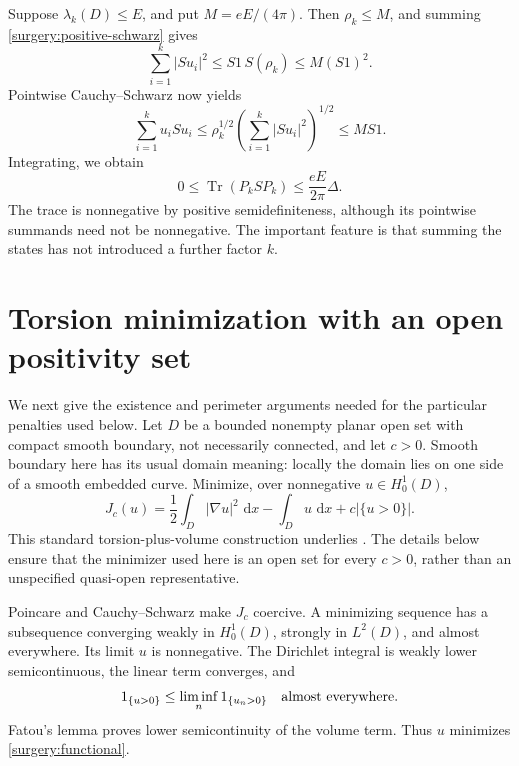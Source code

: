 \documentclass[11pt,reqno]{amsart}
\numberwithin{equation}{section}
\newcommand{\dd}{\,\mathrm d}
\newcommand{\abs}[1]{\lvert#1\rvert}
\begin{document}
Suppose \(\lambda_k(D)\le E\), and put \(M=eE/(4\pi)\).  Then
\(\rho_k\le M\), and summing \eqref{surgery:positive-schwarz} gives
\[
 \sum_{i=1}^k\abs{Su_i}^2
 \le S1\,S(\rho_k)\le M(S1)^2.
\]
Pointwise Cauchy--Schwarz now yields
\[
 \sum_{i=1}^k u_iSu_i
 \le \rho_k^{1/2}
       \left(\sum_{i=1}^k\abs{Su_i}^2\right)^{1/2}
 \le M S1.
\]
Integrating, we obtain
\begin{equation}
 0\le\operatorname{Tr}(P_kSP_k)
 \le \frac{eE}{2\pi}\Delta.
 \label{surgery:trace}
\end{equation}
The trace is nonnegative by positive semidefiniteness, although its
pointwise summands need not be nonnegative.  The important feature is
that summing the states has not introduced a further factor \(k\).

\section{Torsion minimization with an open positivity set}
\label{surgery:minimization}

We next give the existence and perimeter arguments needed for the
particular penalties used below.  Let \(D\) be a bounded nonempty
planar open set with compact smooth boundary, not necessarily
connected, and let \(c>0\).  Smooth boundary here has its usual domain
meaning: locally the domain lies on one side of a smooth embedded
curve.  Minimize, over nonnegative \(u\in H^1_0(D)\),
\begin{equation}
 J_c(u)=\frac12\int_D\abs{\nabla u}^2\,\dd x
            -\int_Du\,\dd x+c\abs{\{u>0\}}.
 \label{surgery:functional}
\end{equation}
This standard torsion-plus-volume construction underlies
\cite{Bucur2012,BucurMazzoleni2015}.  The details below ensure that the
minimizer used here is an open set for every \(c>0\), rather than an
unspecified quasi-open representative.

Poincare and Cauchy--Schwarz make \(J_c\) coercive.  A minimizing
sequence has a subsequence converging weakly in \(H^1_0(D)\), strongly
in \(L^2(D)\), and almost everywhere.  Its limit \(u\) is nonnegative.
The Dirichlet integral is weakly lower semicontinuous, the linear
term converges, and
\[
 1_{\{u>0\}}\le\liminf_n1_{\{u_n>0\}}
 \quad\hbox{almost everywhere}.
\]
Fatou's lemma proves lower semicontinuity of the volume term.
Thus \(u\) minimizes \eqref{surgery:functional}.
\end{document}
